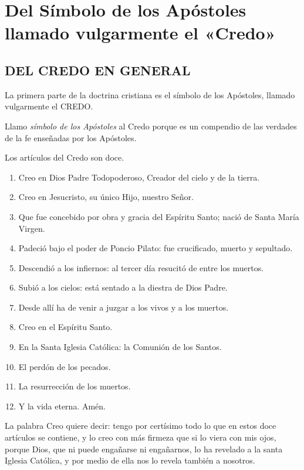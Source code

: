 \chapter{Del Símbolo de los Apóstoles llamado vulgarmente el «Credo»}
\section{DEL CREDO EN GENERAL}
 La primera parte de la doctrina cristiana es el símbolo de los Apóstoles, llamado vulgarmente el CREDO.

 Llamo \textit{símbolo de los Apóstoles} al Credo porque es un compendio de las verdades de la fe enseñadas por los Apóstoles.

 Los artículos del Credo son doce.


\begin{enumerate}
	\item Creo en Dios Padre Todopoderoso, Creador del cielo y de la tierra.
	\item Creo en Jesucristo, su único Hijo, nuestro Señor.
	\item Que fue concebido por obra y gracia del Espíritu Santo; nació de Santa María Virgen.
	\item Padeció bajo el poder de Poncio Pilato: fue crucificado, muerto y sepultado.
	\item Descendió a los infiernos: al tercer día resucitó de entre los muertos.
	\item Subió a los cielos: está sentado a la diestra de Dios Padre.
	\item Desde allí ha de venir a juzgar a los vivos y a los muertos.
	\item Creo en el Espíritu Santo.
	\item En la Santa Iglesia Católica: la Comunión de los Santos.
	\item El perdón de los pecados.
	\item La resurrección de los muertos.
	\item Y la vida eterna. Amén.
\end{enumerate}

 La palabra Creo quiere decir: tengo por certísimo todo lo que en estos doce artículos se contiene, y lo creo con más firmeza que si lo viera con mis ojos, porque Dios, que ni puede engañarse ni engañarnos, lo ha revelado a la santa Iglesia Católica, y por medio de ella nos lo revela también a nosotros.

